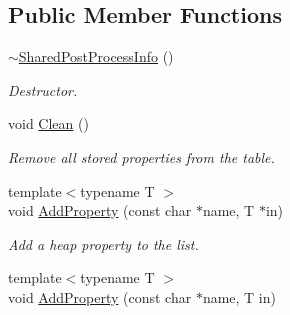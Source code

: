 \subsection*{Public Member Functions}
\begin{DoxyCompactItemize}
\item 
\hypertarget{class_assimp_1_1_shared_post_process_info_adae75c16fac4d25a482e0486f7667136}{\hyperlink{class_assimp_1_1_shared_post_process_info_adae75c16fac4d25a482e0486f7667136}{$\sim$\+Shared\+Post\+Process\+Info} ()}\label{class_assimp_1_1_shared_post_process_info_adae75c16fac4d25a482e0486f7667136}

\begin{DoxyCompactList}\small\item\em Destructor. \end{DoxyCompactList}\item 
\hypertarget{class_assimp_1_1_shared_post_process_info_a41010c4a2a35a056d124a35438591b9c}{void \hyperlink{class_assimp_1_1_shared_post_process_info_a41010c4a2a35a056d124a35438591b9c}{Clean} ()}\label{class_assimp_1_1_shared_post_process_info_a41010c4a2a35a056d124a35438591b9c}

\begin{DoxyCompactList}\small\item\em Remove all stored properties from the table. \end{DoxyCompactList}\item 
\hypertarget{class_assimp_1_1_shared_post_process_info_a3b59e81c3a4e0d515022d238ce3538c7}{{\footnotesize template$<$typename T $>$ }\\void \hyperlink{class_assimp_1_1_shared_post_process_info_a3b59e81c3a4e0d515022d238ce3538c7}{Add\+Property} (const char $\ast$name, T $\ast$in)}\label{class_assimp_1_1_shared_post_process_info_a3b59e81c3a4e0d515022d238ce3538c7}

\begin{DoxyCompactList}\small\item\em Add a heap property to the list. \end{DoxyCompactList}\item 
\hypertarget{class_assimp_1_1_shared_post_process_info_a61a4c99db2740e9b213d424c4933656f}{{\footnotesize template$<$typename T $>$ }\\void \hyperlink{class_assimp_1_1_shared_post_process_info_a61a4c99db2740e9b213d424c4933656f}{Add\+Property} (const char $\ast$name, T in)}\label{class_assimp_1_1_shared_post_process_info_a61a4c99db2740e9b213d424c4933656f}


\end{DoxyCompactItemize}
